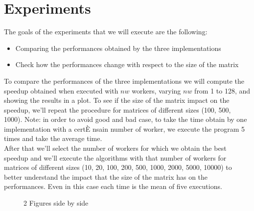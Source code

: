 \documentclass[12pt]{article}
\begin{document}
	\section{Experiments}
	The goals of the experiments that we will execute are the following: 
	\begin{itemize}
		\item Comparing the performances obtained by the three implementations 
		\item Check how the performances change with respect to the size of the matrix
	\end{itemize}
	To compare the performances of the three implementations we will compute the speedup obtained when executed with $nw$ workers, varying $nw$ from 1 to 128, and showing the results in a plot. To see if the size of the matrix impact on the speedup, we'll repeat the procedure for matrices of different sizes (100, 500, 1000). Note: in order to avoid good and bad case, to take the time obtain by one implementation with a certÈ nsain number of worker, we execute the program 5 times and take the average time. \\
	After that we'll select the number of workers for which we obtain the best speedup and we'll execute the algorithms with that number of workers for matrices of different sizes (10, 20, 100, 200, 500, 1000, 2000, 5000, 10000) to better understand the impact that the size of the matrix has on the performances. Even in this case each time is the mean of five executions.
	\begin{figure}[H]
		\centering
		\qquad
		\caption{2 Figures side by side}%
		\label{fig:example}%
	\end{figure}
\end{document}
